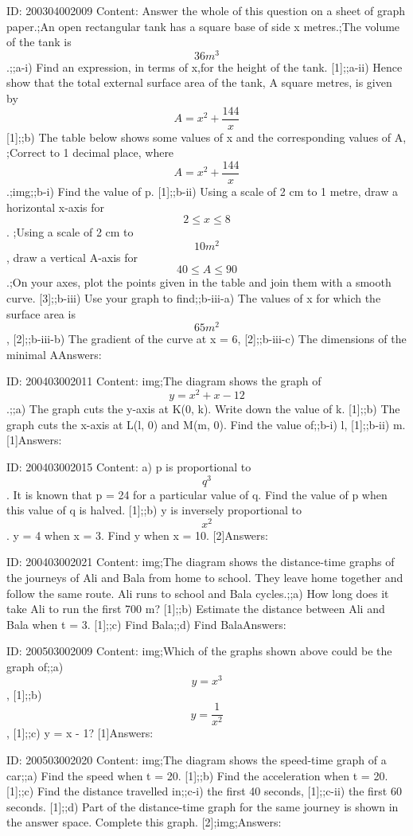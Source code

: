 \documentclass{article}
\begin{document}
ID: 200304002009
Content:
Answer the whole of this question on a sheet of graph paper.;An open rectangular tank has a square base of side x metres.;The volume of the tank is $$36 m^3$$.;;a-i) Find an expression, in terms of x,for the height of the tank.   [1];;a-ii) Hence show that the total external surface area of the tank, A square metres, is given by $$A = x^2 + \frac{144}{x}$$ [1];;b) The table below shows some values of x and the corresponding values of A, ;Correct to 1 decimal place, where $$A = x^2 + \frac{144}{x}$$.;img;;b-i) Find the value of p.   [1];;b-ii) Using a scale of 2 cm to 1 metre, draw a horizontal x-axis for $$2 \leq x \leq 8$$. ;Using a scale of 2 cm to $$10 m^2$$, draw a vertical A-axis for $$40 \leq A \leq 90$$.;On your axes, plot the points given in the table and join them with a smooth curve.   [3];;b-iii) Use your graph to find;;b-iii-a) The values of x for which the surface area is $$65 m^2$$,   [2];;b-iii-b) The gradient of the curve at x = 6,   [2];;b-iii-c) The dimensions of the minimal AAnswers:

ID: 200403002011
Content:
img;The diagram shows the graph of $$y= x^{2} + x -12$$.;;a) The graph cuts the y-axis at K(0, k). Write down the value of k. [1];;b) The graph cuts the x-axis at L(l, 0) and M(m, 0). Find the value of;;b-i) l, [1];;b-ii) m. [1]Answers:

ID: 200403002015
Content:
a) p is proportional to $$q^{3} $$. It is known that p = 24 for a particular value of q. Find the value of p when this value of q is halved. [1];;b) y is inversely proportional to $$x^{2} $$. y = 4 when x = 3. Find y when x = 10. [2]Answers:

ID: 200403002021
Content:
img;The diagram shows the distance-time graphs of the journeys of Ali and Bala from home to school. They leave home together and follow the same route. Ali runs to school and Bala cycles.;;a) How long does it take Ali to run the first 700 m? [1];;b) Estimate the distance between Ali and Bala when t = 3. [1];;c) Find Bala;;d) Find BalaAnswers:

ID: 200503002009
Content:
img;Which of the graphs shown above could be the graph of;;a) $$y=x^{3} $$ ,  [1];;b) $$y=\frac{1}{x^{2}}$$, [1];;c) y = x - 1? [1]Answers:

ID: 200503002020
Content:
img;The diagram shows the speed-time graph of a car;;a) Find the speed when t = 20. [1];;b) Find the acceleration when t = 20. [1];;c) Find the distance travelled in;;c-i) the first 40 seconds, [1];;c-ii) the first 60 seconds. [1];;d) Part of the distance-time graph for the same journey is shown in the answer space. Complete this graph. [2];img;Answers:
\end{document}
